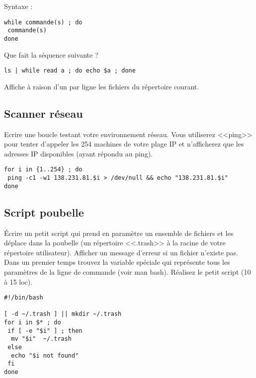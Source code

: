 \documentclass[11pt]{article}
\begin{document}
Syntaxe :

\begin{verbatim}
while commande(s) ; do
 commande(s)
done
\end{verbatim}

Que fait la séquence suivante ?

\begin{lstlisting}
ls | while read a ; do echo $a ; done
\end{lstlisting}

\begin{solution}
Affiche à raison d'un par ligne les fichiers du répertoire courant.
\end{solution}

\subsection{Scanner réseau}

Ecrire une boucle testant votre environnement réseau. Vous utiliserez <<ping>> pour tenter d'appeler les 254 machines de votre plage IP et n'afficherez que les adresses IP disponibles (ayant répondu au ping).

\begin{solution}
\begin{verbatim}
for i in {1..254} ; do 
 ping -c1 -w1 138.231.81.$i > /dev/null && echo "138.231.81.$i"
done
\end{verbatim}
\end{solution}

\subsection{Script poubelle}

Écrire un petit script qui prend en paramètre un ensemble de fichiers et les déplace dans la poubelle (un répertoire <<.trash>> à la racine de votre répertoire utilisateur).
Afficher un message d'erreur si un fichier n'existe pas.
Dans un premier temps trouvez la variable spéciale qui représente tous les paramètres de la ligne de commande (voir man bash).
Réalisez le petit script (10 à 15 loc).

\begin{solution}
\begin{verbatim}
#!/bin/bash

[ -d ~/.trash ] || mkdir ~/.trash
for i in $* ; do
 if [ -e "$i" ] ; then
  mv "$i"  ~/.trash
 else
  echo "$i not found"
 fi
done
\end{verbatim}
\end{solution}
\end{document}

